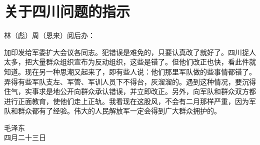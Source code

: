 \section[关于四川问题的指示（一九六七年四月二十三日）]{关于四川问题的指示}


林（彪）周（恩来）阅后办：

加印发给军委扩大会议各同志。犯错误是难免的，只要认真改了就好了。四川捉人太多，把大量群众组织宣布为反动组织，这些是错了。但他们改正也快，看此件就知道。现在另一种思潮又起来了，即有些人说：他们那里军队做的些事情都错了。弄得有些军队支左、军管、军训人员下不得台，灰溜溜的。遇到这种情况，要沉得住气，实事求是地公开向群众承认错误，并立即改正。另外，向军队和群众双方都进行正面教育，使他们走上正轨。我看现在这股风，不会有二月那样严重，因为军队和群众都有了经验。伟大的人民解放军一定会得到广大群众拥护的。
{\raggedleft 毛泽东\\四月二十三日\par}


